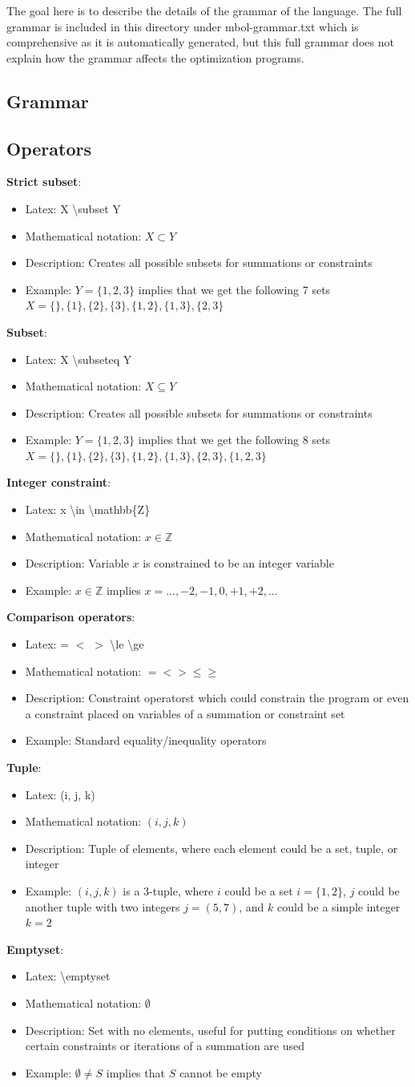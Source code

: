 \documentclass{article}
\newcommand{\mboldescrip}[5]{
    \vspace{0.5in}
    \textbf{#1}:
    \begin{itemize}
        \item Latex: #2
        \item Mathematical notation: #3
        \item Description: #4
        \item Example: #5
    \end{itemize}
}
\begin{document}
The goal here is to describe the details of the grammar of the language. The full grammar is included in this directory under mbol-grammar.txt which is comprehensive as it is automatically generated, but this full grammar does not explain how the grammar affects the optimization programs.

\subsection{Grammar}

\begin{mbol}
\end{mbol}

\subsection{Operators}

\mboldescrip{Strict subset}{X \textbackslash subset Y}{$X \subset Y$}{Creates all possible subsets for summations or constraints}{$Y=\{1,2,3\}$ implies that we get the following 7 sets $X=\{\},\{1\},\{2\},\{3\},\{1,2\},\{1,3\},\{2,3\}$}

\mboldescrip{Subset}{X \textbackslash subseteq Y}{$X \subseteq Y$}{Creates all possible subsets for summations or constraints}{$Y=\{1,2,3\}$ implies that we get the following 8 sets $X=\{\},\{1\},\{2\},\{3\},\{1,2\},\{1,3\},\{2,3\},\{1,2,3\}$}

\mboldescrip{Integer constraint}{x \textbackslash in \textbackslash mathbb\{Z\}}{$x\in \mathbb{Z}$}{Variable $x$ is constrained to be an integer variable}{$x \in \mathbb{Z}$ implies $x = ...,-2,-1,0,+1,+2,...$}

\mboldescrip{Comparison operators}{= $<$ $>$ \textbackslash le \textbackslash ge}{$= < > \le \ge$}{Constraint operatorst which could constrain the program or even a constraint placed on variables of a summation or constraint set}{Standard equality/inequality operators}

\mboldescrip{Tuple}{(i, j, k)}{$(i,j,k)$}{Tuple of elements, where each element could be a set, tuple, or integer}{$(i,j,k)$ is a 3-tuple, where $i$ could be a set $i=\{1,2\}$, $j$ could be another tuple with two integers $j=(5,7)$, and $k$ could be a simple integer $k=2$}

\mboldescrip{Emptyset}{\textbackslash emptyset}{$\emptyset$}{Set with no elements, useful for putting conditions on whether certain constraints or iterations of a summation are used}{$\emptyset \ne S$ implies that $S$ cannot be empty}
\end{document}

